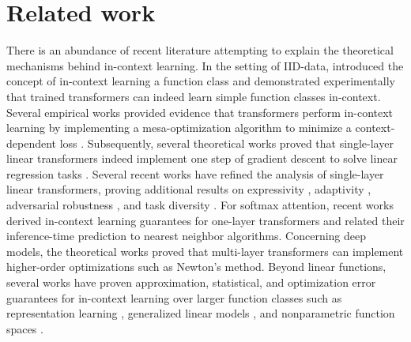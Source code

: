 \section{Related work}
There is an abundance of recent literature attempting to explain the theoretical mechanisms behind in-context learning. In the setting of IID-data, \cite{garg2022can} introduced the concept of in-context learning a function class and demonstrated experimentally that trained transformers can indeed learn simple function classes in-context. Several empirical works provided evidence that transformers perform in-context learning by implementing a mesa-optimization algorithm to minimize a context-dependent loss \cite{von2023transformers,akyurek2022learning,dai2022can,muller2021transformers}. Subsequently, several theoretical works proved that single-layer linear transformers indeed implement one step of gradient descent to solve linear regression tasks \cite{zhang2023trained,mahankali2023one,ahn2023transformers, wu2023many}.  Several recent works have refined the analysis of single-layer linear transformers, proving additional results on expressivity \cite{zhang2024context}, adaptivity \cite{vladymyrov2024linear}, adversarial robustness \cite{anwar2024adversarial}, and task diversity \cite{cole2024provable, lu2024asymptotic}. For softmax attention, recent works \cite{collins2024context, li2024one} derived in-context learning guarantees for one-layer transformers and related their inference-time prediction to nearest neighbor algorithms. Concerning deep models, the theoretical works \cite{giannou2024well,fu2023transformers} proved that multi-layer transformers can implement higher-order optimizations such as Newton's method. Beyond linear functions, several works have proven approximation, statistical, and optimization error guarantees for in-context learning over larger function classes such as representation learning \cite{yang2024context,guo2023transformers, kim2024transformers2}, generalized linear models \cite{bai2024transformers}, and nonparametric function spaces \cite{kim2024transformers, collins2024context}.

